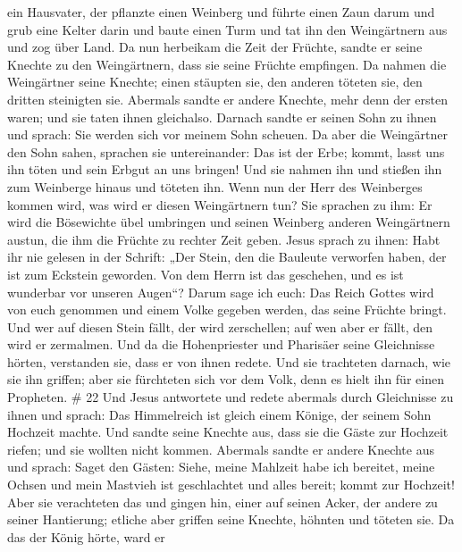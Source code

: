 ein Hausvater, der pflanzte einen Weinberg und führte einen Zaun darum
und grub eine Kelter darin und baute einen Turm und tat ihn den
Weingärtnern aus und zog über Land.  Da nun herbeikam die
Zeit der Früchte, sandte er seine Knechte zu den Weingärtnern, dass sie
seine Früchte empfingen.  Da nahmen die Weingärtner seine
Knechte; einen stäupten sie, den anderen töteten sie, den dritten
steinigten sie.  Abermals sandte er andere Knechte, mehr
denn der ersten waren; und sie taten ihnen gleichalso. 
Darnach sandte er seinen Sohn zu ihnen und sprach: Sie werden sich vor
meinem Sohn scheuen.  Da aber die Weingärtner den Sohn
sahen, sprachen sie untereinander: Das ist der Erbe; kommt, lasst uns
ihn töten und sein Erbgut an uns bringen!  Und sie nahmen
ihn und stießen ihn zum Weinberge hinaus und töteten ihn. 
Wenn nun der Herr des Weinberges kommen wird, was wird er diesen
Weingärtnern tun?  Sie sprachen zu ihm: Er wird die
Bösewichte übel umbringen und seinen Weinberg anderen Weingärtnern
austun, die ihm die Früchte zu rechter Zeit geben.  Jesus
sprach zu ihnen: Habt ihr nie gelesen in der Schrift: „Der Stein, den
die Bauleute verworfen haben, der ist zum Eckstein geworden. Von dem
Herrn ist das geschehen, und es ist wunderbar vor unseren Augen``?
 Darum sage ich euch: Das Reich Gottes wird von euch
genommen und einem Volke gegeben werden, das seine Früchte bringt.
 Und wer auf diesen Stein fällt, der wird zerschellen; auf
wen aber er fällt, den wird er zermalmen.  Und da die
Hohenpriester und Pharisäer seine Gleichnisse hörten, verstanden sie,
dass er von ihnen redete.  Und sie trachteten darnach, wie
sie ihn griffen; aber sie fürchteten sich vor dem Volk, denn es hielt
ihn für einen Propheten. \# 22  Und Jesus antwortete und
redete abermals durch Gleichnisse zu ihnen und sprach:  Das
Himmelreich ist gleich einem Könige, der seinem Sohn Hochzeit machte.
 Und sandte seine Knechte aus, dass sie die Gäste zur
Hochzeit riefen; und sie wollten nicht kommen.  Abermals
sandte er andere Knechte aus und sprach: Saget den Gästen: Siehe, meine
Mahlzeit habe ich bereitet, meine Ochsen und mein Mastvieh ist
geschlachtet und alles bereit; kommt zur Hochzeit!  Aber sie
verachteten das und gingen hin, einer auf seinen Acker, der andere zu
seiner Hantierung;  etliche aber griffen seine Knechte,
höhnten und töteten sie.  Da das der König hörte, ward er
